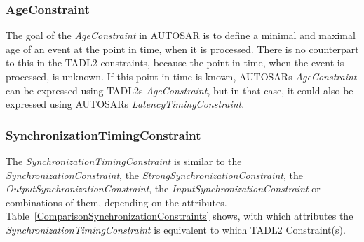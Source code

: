 	\subsubsection{AgeConstraint}
		The goal of the \emph{AgeConstraint} in AUTOSAR is to define a minimal and maximal age of an event at the point in time, when it is processed. There is no counterpart to this in the TADL2 constraints, because the point in time, when the event is processed, is unknown. If this point in time is known, AUTOSARs \emph{AgeConstraint} can be expressed using TADL2s \emph{AgeConstraint}, but in that case, it could also be expressed using AUTOSARs \emph{LatencyTimingConstraint}.
		
	\subsubsection{SynchronizationTimingConstraint}
		The \emph{SynchronizationTimingConstraint} is similar to the \emph{SynchronizationConstraint}, the \emph{StrongSynchronizationConstraint}, the \emph{OutputSynchronizationConstraint}, the \emph{InputSynchronizationConstraint} or combinations of them, depending on the attributes. Table~\ref{ComparisonSynchronizationConstraints} shows, with which attributes the \emph{SynchronizationTimingConstraint} is equivalent to which TADL2 Constraint(s).
